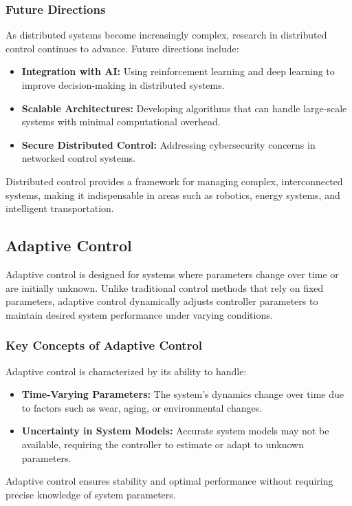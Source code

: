 \documentclass{IEEEojcsys}
\begin{document}
\subsubsection{Future Directions}
As distributed systems become increasingly complex, research in distributed control continues to advance. Future directions include:
\begin{itemize}
    \item \textbf{Integration with AI:} Using reinforcement learning and deep learning to improve decision-making in distributed systems.
    \item \textbf{Scalable Architectures:} Developing algorithms that can handle large-scale systems with minimal computational overhead.
    \item \textbf{Secure Distributed Control:} Addressing cybersecurity concerns in networked control systems.
\end{itemize}

Distributed control provides a framework for managing complex, interconnected systems, making it indispensable in areas such as robotics, energy systems, and intelligent transportation.

\subsection{Adaptive Control}
Adaptive control is designed for systems where parameters change over time or are initially unknown. Unlike traditional control methods that rely on fixed parameters, adaptive control dynamically adjusts controller parameters to maintain desired system performance under varying conditions.

\subsubsection{Key Concepts of Adaptive Control}
Adaptive control is characterized by its ability to handle:
\begin{itemize}
    \item \textbf{Time-Varying Parameters:} The system's dynamics change over time due to factors such as wear, aging, or environmental changes.
    \item \textbf{Uncertainty in System Models:} Accurate system models may not be available, requiring the controller to estimate or adapt to unknown parameters.
\end{itemize}
Adaptive control ensures stability and optimal performance without requiring precise knowledge of system parameters.
\end{document}
